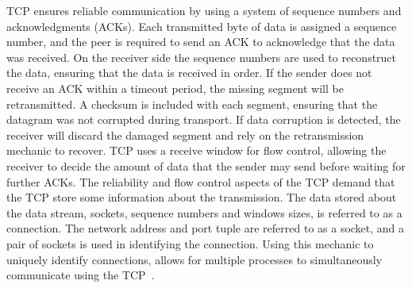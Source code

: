 \documentclass[english, 12pt, a4paper, elec, utf8, a-2b, online]{aaltothesis}
\begin{document}
TCP ensures reliable communication by using a system of sequence numbers and
acknowledgments (ACKs). Each transmitted byte of data is assigned a sequence
number, and the peer is required to send an ACK to acknowledge that the data was
received. On the receiver side the sequence numbers are used to reconstruct the
data, ensuring that the data is received in order. If the sender does not receive
an ACK within a timeout period, the missing segment will be retransmitted. A
checksum is included with each segment, ensuring that the datagram was not
corrupted during transport. If data corruption is detected, the receiver will
discard the damaged segment and rely on the retransmission mechanic to recover.
TCP uses a receive window for flow control, allowing the receiver to decide 
the amount of data that the sender may send before waiting for further ACKs. The
reliability and flow control aspects of the TCP demand that the TCP store some
information about the transmission. The data stored about the data stream, sockets,
sequence numbers and windows sizes, is referred to as a connection. The network
address and port tuple are referred to as a socket, and a pair of sockets is used
in identifying the connection. Using this mechanic to uniquely identify connections,
allows for multiple processes to simultaneously communicate using the TCP~\cite{rfc793}.
\end{document}
